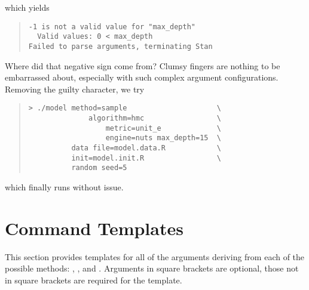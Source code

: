 %
which yields
%
\begin{quote}
\begin{Verbatim}
-1 is not a valid value for "max_depth"
  Valid values: 0 < max_depth
Failed to parse arguments, terminating Stan
\end{Verbatim}
\end{quote}
%
Where did that negative sign come from?  Clumsy fingers are nothing
to be embarrassed about, especially with such complex argument 
configurations.  Removing the guilty character, we try
%
\begin{quote}
\begin{Verbatim}[fontshape=sl]
> ./model method=sample                     \
              algorithm=hmc                 \
                  metric=unit_e             \
                  engine=nuts max_depth=15  \
          data file=model.data.R            \
          init=model.init.R                 \
          random seed=5
\end{Verbatim}
\end{quote}
%
which finally runs without issue.

\section{Command Templates}

This section provides templates for all of the arguments deriving from
each of the possible methods: , , and .  
Arguments in square brackets are optional,
those not in square brackets are required for the template.

